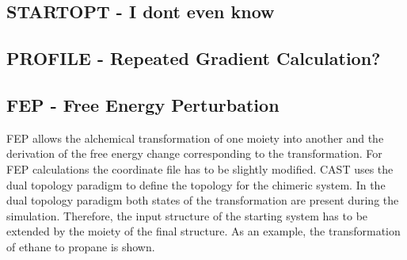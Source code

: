 \documentclass[10pt,a4paper]{article} %
\newif\ifdevmode %
\begin{document}
	\subsection{STARTOPT - I dont even know}	
	\ifdevmode \colorbox{red}{write something here} \fi	

	\subsection{PROFILE - Repeated Gradient Calculation?}	
	\ifdevmode \colorbox{red}{write something here} \fi	

	\subsection{FEP - Free Energy Perturbation}
	\acf{FEP} allows the alchemical transformation of one moiety into another and the derivation of the free energy change corresponding to the transformation. For \ac{FEP} calculations the coordinate file has to be slightly modified. \ac{CAST} uses the dual topology paradigm to define the topology for the chimeric system. In the dual topology paradigm both states of the transformation are present during the simulation. Therefore, the input structure of the starting system has to be extended by the moiety of the final structure. As an example, the transformation of ethane to propane is shown. \\
\end{document}
